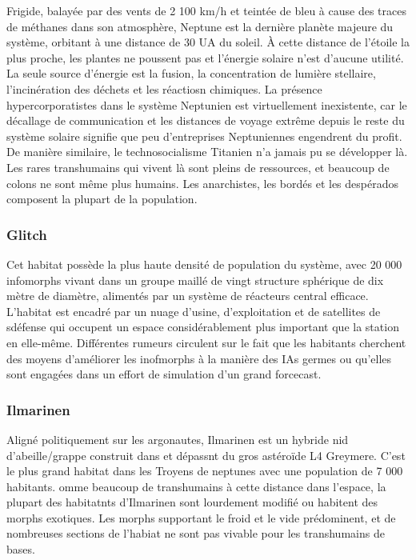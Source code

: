 Frigide, balayée par des vents de 2 100 km/h et teintée de bleu à cause des traces de méthanes dans son atmosphère, Neptune est la dernière planète majeure du système, orbitant à une distance de 30 UA du soleil. À cette distance de l'étoile la plus proche, les plantes ne poussent pas et l'énergie solaire n'est d'aucune utilité. La seule source d'énergie est la fusion, la concentration de lumière stellaire, l'incinération des déchets et les réactiosn chimiques. La présence hypercorporatistes dans le système Neptunien est virtuellement inexistente, car le décallage de communication et les distances de voyage extrême depuis le reste du système solaire signifie que peu d'entreprises Neptuniennes engendrent du profit. De manière similaire, le technosocialisme Titanien n'a jamais pu se développer là. Les rares transhumains qui vivent là sont pleins de ressources, et beaucoup de colons ne sont même plus humains. Les anarchistes, les bordés et les despérados composent la plupart de la population. 

\subsubsection{Glitch} \label{sec:glitch} 

Cet habitat possède la plus haute densité de population du système, avec 20 000 infomorphs vivant dans un groupe maillé de vingt structure sphérique de dix mètre de diamètre, alimentés par un système de réacteurs central efficace. L'habitat est encadré par un nuage d'usine, d'exploitation et de satellites de sdéfense qui occupent un espace considérablement plus important que la station en elle-même. Différentes rumeurs circulent sur le fait que les habitants cherchent des moyens d'améliorer les inofmorphs à la manière des IAs germes ou qu'elles sont engagées dans un effort de simulation d'un grand forcecast. 

\subsubsection{Ilmarinen} \label{sec:ilmarinen} 

Aligné politiquement sur les argonautes, Ilmarinen est un hybride nid d'abeille/grappe construit dans et dépassnt du gros astéroïde L4 Greymere. C'est le plus grand habitat dans les Troyens de neptunes avec une population de 7 000 habitants. omme beaucoup de transhumains à cette distance dans l'espace, la plupart des habitatnts d'Ilmarinen sont lourdement modifié ou habitent des morphs exotiques. Les morphs supportant le froid et le vide prédominent, et de nombreuses sections de l'habiat ne sont pas vivable pour les transhumains de bases. 

